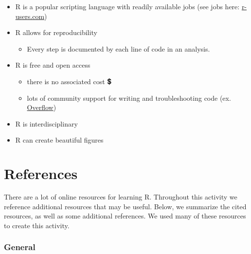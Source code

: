 \documentclass[
]{book}
\providecommand{\tightlist}{%
  \setlength{\itemsep}{0pt}\setlength{\parskip}{0pt}}
\begin{document}
\begin{itemize}
\item
  R is a popular scripting language with readily available jobs (see jobs here: \href{https://www.r-users.com/}{r-users.com})
\item
  R allows for reproducibility

  \begin{itemize}
  \tightlist
  \item
    Every step is documented by each line of code in an analysis.
  \end{itemize}
\item
  R is free and open access

  \begin{itemize}
  \tightlist
  \item
    there is no associated cost 💲
  \item
    lots of community support for writing and troubleshooting code (ex. \href{https://stackoverflow.com/}{Overflow})
  \end{itemize}
\item
  R is interdisciplinary
\item
  R can create beautiful figures
\end{itemize}

\hypertarget{references}{%
\section{References}\label{references}}

There are a lot of online resources for learning R. Throughout this activity we reference additional resources that may be useful. Below, we summarize the cited resources, as well as some additional references. We used many of these resources to create this activity.

\hypertarget{general}{%
\subsubsection*{General}\label{general}}
\end{document}
